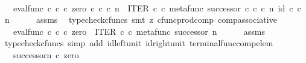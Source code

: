 \begin{isabellebody}
\ \ \isamarkupfalse%
\ \isamarkupfalse%
\ {\isachardoublequoteopen}{\isachardot}{\kern0pt}{\isachardot}{\kern0pt}{\isachardot}{\kern0pt}\ {\isacharequal}{\kern0pt}\ eval{\isacharunderscore}{\kern0pt}func\ {\isasymnat}\isactrlsub c\ {\isasymnat}\isactrlsub c\ {\isasymcirc}\isactrlsub c\ {\isasymlangle}zero\ {\isasymcirc}\isactrlsub c\ {\isasymbeta}\isactrlbsub {\isasymnat}\isactrlsub c\isactrlesub \ {\isasymcirc}\isactrlsub c\ n\ {\isacharcomma}{\kern0pt}\ ITER\ {\isasymnat}\isactrlsub c\ {\isasymcirc}\isactrlsub c\ {\isasymlangle}metafunc\ successor\ {\isasymcirc}\isactrlsub c\ {\isasymbeta}\isactrlbsub {\isasymnat}\isactrlsub c\isactrlesub \ {\isasymcirc}\isactrlsub c\ n{\isacharcomma}{\kern0pt}\ id\ {\isasymnat}\isactrlsub c\ {\isasymcirc}\isactrlsub c\ n{\isasymrangle}{\isasymrangle}{\isachardoublequoteclose}\isanewline
\ \ \ \ \isamarkupfalse%
\ assms\ \isamarkupfalse%
\ {\isacharparenleft}{\kern0pt}typecheck{\isacharunderscore}{\kern0pt}cfuncs{\isacharcomma}{\kern0pt}\ smt\ {\isacharparenleft}{\kern0pt}z{}{\isacharparenright}{\kern0pt}\ cfunc{\isacharunderscore}{\kern0pt}prod{\isacharunderscore}{\kern0pt}comp\ comp{\isacharunderscore}{\kern0pt}associative{}{\isacharparenright}{\kern0pt}\isanewline
\ \ \isamarkupfalse%
\ \isamarkupfalse%
\ {\isachardoublequoteopen}{\isachardot}{\kern0pt}{\isachardot}{\kern0pt}{\isachardot}{\kern0pt}\ {\isacharequal}{\kern0pt}\ eval{\isacharunderscore}{\kern0pt}func\ {\isasymnat}\isactrlsub c\ {\isasymnat}\isactrlsub c\ {\isasymcirc}\isactrlsub c\ {\isasymlangle}zero{\isacharcomma}{\kern0pt}\ \ ITER\ {\isasymnat}\isactrlsub c\ {\isasymcirc}\isactrlsub c\ {\isasymlangle}metafunc\ successor{\isacharcomma}{\kern0pt}\ n{\isasymrangle}{\isasymrangle}{\isachardoublequoteclose}\isanewline
\ \ \ \ \isamarkupfalse%
\ assms\ \isamarkupfalse%
\ {\isacharparenleft}{\kern0pt}typecheck{\isacharunderscore}{\kern0pt}cfuncs{\isacharcomma}{\kern0pt}\ simp\ add{\isacharcolon}{\kern0pt}\ id{\isacharunderscore}{\kern0pt}left{\isacharunderscore}{\kern0pt}unit{}\ id{\isacharunderscore}{\kern0pt}right{\isacharunderscore}{\kern0pt}unit{}\ terminal{\isacharunderscore}{\kern0pt}func{\isacharunderscore}{\kern0pt}comp{\isacharunderscore}{\kern0pt}elem{\isacharparenright}{\kern0pt}\isanewline
\ \ \isamarkupfalse%
\ \isamarkupfalse%
\ {\isachardoublequoteopen}{\isachardot}{\kern0pt}{\isachardot}{\kern0pt}{\isachardot}{\kern0pt}\ {\isacharequal}{\kern0pt}\ {\isacharparenleft}{\kern0pt}successor\isactrlbsup {\isasymcirc}n\isactrlesup {\isacharparenright}{\kern0pt}\ {\isasymcirc}\isactrlsub c\ zero{\isachardoublequoteclose}\isanewline

\end{isabellebody}
